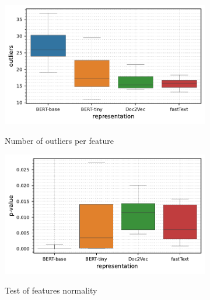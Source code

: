 \begin{figure}[t]
    \begin{subfigure}[b]{0.495\textwidth}
        \centering
        \caption{\small Number of outliers per feature}
        \includegraphics[width=\textwidth]{images/real-characteristics/text-20newsgroups/properties-20newsgroups-noutliers(representation,representation)-representation_BERT-base,BERT-tiny,Doc2Vec,fastText-class_0,16-data_ID-train.pdf}
        \label{fig:text-20newsgroups-outliers}
    \end{subfigure}
    \hfill
    \begin{subfigure}[b]{0.495\textwidth}
        \centering
        \caption{\small Test of features normality}
        \includegraphics[width=\textwidth]{images/real-characteristics/text-20newsgroups/properties-20newsgroups-pval(representation,representation)-representation_BERT-base,BERT-tiny,Doc2Vec,fastText-class_0,16-data_ID-train.pdf}
        \label{fig:text-20newsgroups-pvalue}
    \end{subfigure}
    \begin{subfigure}[b]{0.495\textwidth}
        \centering

\end{subfigure}
\end{figure}
